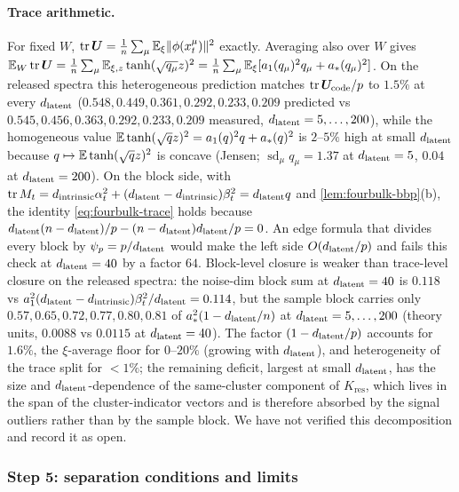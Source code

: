 \paragraph{Trace arithmetic.}
For fixed $W$, $\operatorname{tr}\bm{U}=\tfrac1{n}\sum_\mu\mathbb{E}_\xi\|\phi(x_t^\mu)\|^2$ exactly. Averaging also over $W$ gives $\mathbb{E}_W\operatorname{tr}\bm{U}=\tfrac1{n}\sum_\mu\mathbb{E}_{\xi,z}\tanh(\sqrt{q_\mu}z)^2=\tfrac1{n}\sum_\mu\mathbb{E}_\xi[a_1(q_\mu)^2q_\mu+a_*(q_\mu)^2]$. On the released spectra this heterogeneous prediction matches $\operatorname{tr}\bm{U}_{\mathrm{code}}/p$ to $1.5\%$ at every $d_{\mathrm{latent}}$ ($0.548,0.449,0.361,0.292,0.233,0.209$ predicted vs $0.545,0.456,0.363,0.292,0.233,0.209$ measured, $d_{\mathrm{latent}}=5,\dots,200$), while the homogeneous value $\mathbb{E}\tanh(\sqrt qz)^2=a_1(q)^2q+a_*(q)^2$ is $2$--$5\%$ high at small $d_{\mathrm{latent}}$ because $q\mapsto\mathbb{E}\tanh(\sqrt qz)^2$ is concave (Jensen; $\operatorname{sd}_\mu q_\mu=1.37$ at $d_{\mathrm{latent}}=5$, $0.04$ at $d_{\mathrm{latent}}=200$). On the block side, with $\operatorname{tr}M_t=d_{\mathrm{intrinsic}}\alpha_t^2+(d_{\mathrm{latent}}-d_{\mathrm{intrinsic}})\beta_t^2=d_{\mathrm{latent}} q$ and \cref{lem:fourbulk-bbp}(b), the identity \eqref{eq:fourbulk-trace} holds because $d_{\mathrm{latent}}(n-d_{\mathrm{latent}})/p-(n-d_{\mathrm{latent}})d_{\mathrm{latent}}/p=0$. An edge formula that divides every block by $\psi_p=p/d_{\mathrm{latent}}$ would make the left side $O(d_{\mathrm{latent}}/p)$ and fails this check at $d_{\mathrm{latent}}=40$ by a factor $64$. Block-level closure is weaker than trace-level closure on the released spectra: the noise-dim block sum at $d_{\mathrm{latent}}=40$ is $0.118$ vs $a_1^2(d_{\mathrm{latent}}-d_{\mathrm{intrinsic}})\beta_t^2/d_{\mathrm{latent}}=0.114$, but the sample block carries only $0.57,0.65,0.72,0.77,0.80,0.81$ of $a_*^2(1-d_{\mathrm{latent}}/n)$ at $d_{\mathrm{latent}}=5,\dots,200$ (theory units, $0.0088$ vs $0.0115$ at $d_{\mathrm{latent}}=40$). The factor $(1-d_{\mathrm{latent}}/p)$ accounts for $1.6\%$, the $\xi$-average floor for $0$--$20\%$ (growing with $d_{\mathrm{latent}}$), and heterogeneity of the trace split for $<1\%$; the remaining deficit, largest at small $d_{\mathrm{latent}}$, has the size and $d_{\mathrm{latent}}$-dependence of the same-cluster component of $K_{\mathrm{res}}$, which lives in the span of the cluster-indicator vectors and is therefore absorbed by the signal outliers rather than by the sample block. We have not verified this decomposition and record it as open.

\subsubsection{Step 5: separation conditions and limits}

